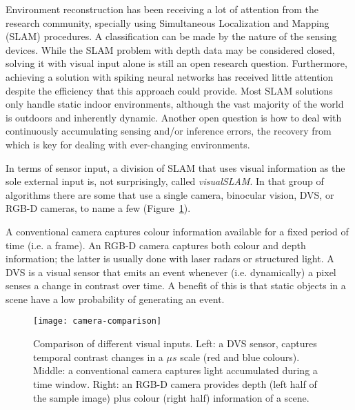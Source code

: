 Environment reconstruction has been receiving a lot of attention from the research  community, specially using Simultaneous Localization and Mapping (SLAM) procedures. 
A classification can be made by the nature of the sensing devices. While the SLAM problem with depth data may be considered closed, solving it with visual input alone is still an open research question. Furthermore, achieving a solution with spiking neural networks has received little attention despite the efficiency that this approach could provide. Most SLAM solutions only handle static indoor environments, although the vast majority of the world is outdoors and inherently dynamic. Another open question is how to deal with continuously accumulating sensing and/or inference errors, the recovery from which is key for dealing with ever-changing environments. 

In terms of sensor input, a division of SLAM that uses visual information as the sole external input is, not surprisingly, called \emph{visualSLAM}. In that group of algorithms  there are some that use a single camera, binocular vision, DVS, or RGB-D cameras, to name a few (Figure~\ref{fig:slam:camera-comparison}). 

A conventional camera captures colour information available for a fixed period of time (i.e. a frame). An RGB-D camera captures both colour and depth information; the latter is usually done with laser radars or structured light. A DVS is a visual sensor that emits an event whenever (i.e. dynamically) a pixel senses a change in contrast over time. A benefit of this is that static objects in a scene have a low probability of generating an event.

\begin{figure}[h]
  \begin{center}
    \texttt{[image: camera-comparison]}
    \caption{Comparison of different visual inputs. Left: a DVS sensor, captures temporal contrast changes in a $\mu s$ scale (red and blue colours). Middle: a conventional camera captures light accumulated during a time window. Right: an RGB-D camera provides depth (left half of the sample image) plus colour (right half) information of a scene.}
    \label{fig:slam:camera-comparison}
  \end{center}
\end{figure}


